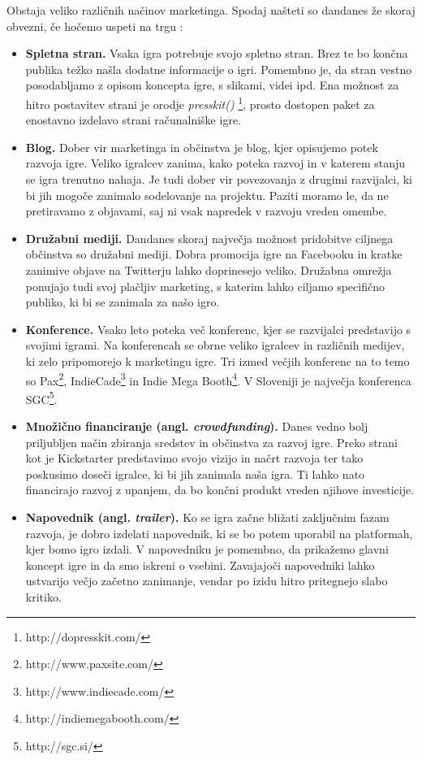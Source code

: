 \documentclass[12pt,a4paper,twoside]{book}
\begin{document}
Obstaja veliko različnih načinov marketinga. Spodaj našteti so dandanes že skoraj obvezni, če hočemo uspeti na trgu \cite{robertMarketing}:
\begin{itemize}
	\item \textbf{Spletna stran.} Vsaka igra potrebuje svojo spletno stran. Brez te bo končna publika težko našla dodatne informacije o igri. Pomembno je, da stran vestno posodabljamo z opisom koncepta igre, s slikami, videi ipd. Ena možnost za hitro postavitev strani je orodje \textit{presskit()} \footnote{http://dopresskit.com/}, prosto dostopen paket za enostavno izdelavo strani računalniške igre.
	\item \textbf{Blog.} Dober vir marketinga in občinstva je blog, kjer opisujemo potek razvoja igre. Veliko igralcev zanima, kako poteka razvoj in v katerem stanju se igra trenutno nahaja. Je tudi dober vir povezovanja z drugimi razvijalci, ki bi jih mogoče zanimalo sodelovanje na projektu. Paziti moramo le, da ne pretiravamo z objavami, saj ni vsak napredek v razvoju vreden omembe.
	\item \textbf{Družabni mediji.} Dandanes skoraj največja možnost pridobitve ciljnega občinstva so družabni mediji. Dobra promocija igre na Facebooku in kratke zanimive objave na Twitterju lahko doprinesejo veliko. Družabna omrežja ponujajo tudi svoj plačljiv marketing, s katerim lahko ciljamo specifično publiko, ki bi se zanimala za našo igro.
	\item \textbf{Konference.} Vsako leto poteka več konferenc, kjer se razvijalci predstavijo s svojimi igrami. Na konferencah	se obrne veliko igralcev in različnih medijev, ki zelo pripomorejo k marketingu igre. Tri izmed večjih konferenc na to temo so Pax\footnote{http://www.paxsite.com/}, IndieCade\footnote{http://www.indiecade.com/} in Indie Mega Booth\footnote{http://indiemegabooth.com/}. V Sloveniji je največja konferenca SGC\footnote{http://sgc.si/}.
	\item \textbf{Množično financiranje (angl. \textit{crowdfunding}).} Danes vedno bolj priljubljen način zbiranja sredstev in občinstva za razvoj igre. Preko strani kot je Kickstarter predstavimo svojo vizijo in načrt razvoja ter tako poskusimo doseči igralce, ki bi jih zanimala naša igra. Ti lahko nato financirajo razvoj z upanjem, da bo končni produkt vreden njihove investicije.
	\item \textbf{Napovednik (angl. \textit{trailer}).} Ko se igra začne bližati zaključnim fazam razvoja, je dobro izdelati napovednik, ki se bo potem uporabil na platformah, kjer bomo igro izdali. V napovedniku je pomembno, da prikažemo glavni koncept igre in da smo iskreni o vsebini. Zavajajoči napovedniki lahko ustvarijo večjo začetno zanimanje, vendar po izidu hitro pritegnejo slabo kritiko.
\end{itemize}
\end{document}
